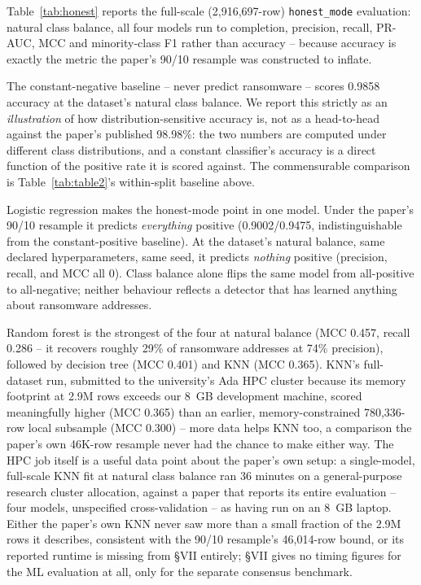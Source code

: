 \documentclass[conference]{IEEEtran}
\begin{document}
Table~\ref{tab:honest} reports the full-scale (2{,}916{,}697-row) \texttt{honest\_mode}
evaluation: natural class balance, all four models run to completion, precision, recall, PR-AUC,
MCC and minority-class F1 rather than accuracy -- because accuracy is exactly the metric the
paper's 90/10 resample was constructed to inflate.

The constant-negative baseline -- never predict ransomware -- scores 0.9858 accuracy at the
dataset's natural class balance. We report this strictly as an \emph{illustration} of how
distribution-sensitive accuracy is, not as a head-to-head against the paper's published 98.98\%:
the two numbers are computed under different class distributions, and a constant classifier's
accuracy is a direct function of the positive rate it is scored against. The commensurable
comparison is Table~\ref{tab:table2}'s within-split baseline above.

Logistic regression makes the honest-mode point in one model. Under the paper's 90/10 resample it
predicts \emph{everything} positive (0.9002/0.9475, indistinguishable from the constant-positive
baseline). At the dataset's natural balance, same declared hyperparameters, same seed, it
predicts \emph{nothing} positive (precision, recall, and MCC all 0). Class balance alone flips
the same model from all-positive to all-negative; neither behaviour reflects a detector that has
learned anything about ransomware addresses.

Random forest is the strongest of the four at natural balance (MCC 0.457, recall 0.286 -- it
recovers roughly 29\% of ransomware addresses at 74\% precision), followed by decision tree (MCC
0.401) and KNN (MCC 0.365). KNN's full-dataset run, submitted to the university's Ada HPC
cluster because its memory footprint at 2.9M rows exceeds our 8~GB development machine, scored
meaningfully higher (MCC 0.365) than an earlier, memory-constrained 780,336-row local subsample
(MCC 0.300) -- more data helps KNN too, a comparison the paper's own 46K-row resample never had
the chance to make either way. The HPC job itself is a useful data point about the paper's own
setup: a single-model, full-scale KNN fit at natural class balance ran 36 minutes on a
general-purpose research cluster allocation, against a paper that reports its entire evaluation
-- four models, unspecified cross-validation -- as having run on an 8~GB laptop. Either the
paper's own KNN never saw more than a small fraction of the 2.9M rows it describes, consistent
with the 90/10 resample's 46,014-row bound, or its reported runtime is missing from \S VII
entirely; \S VII gives no timing figures for the ML evaluation at all, only for the separate
consensus benchmark.
\end{document}
